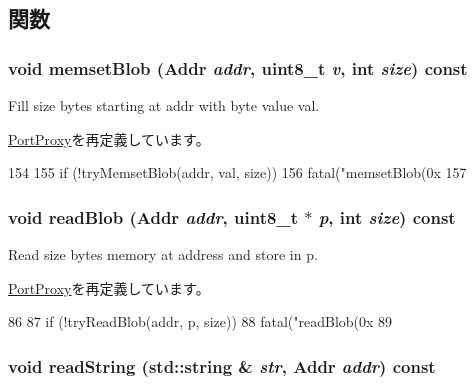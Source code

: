 \subsection{関数}
\hypertarget{classSETranslatingPortProxy_ab8c719f72992ac0e0b2b9a2c464a1456}{
\subsubsection[{memsetBlob}]{\setlength{\rightskip}{0pt plus 5cm}void memsetBlob ({\bf Addr} {\em addr}, \/  uint8\_\-t {\em v}, \/  int {\em size}) const}}
\label{classSETranslatingPortProxy_ab8c719f72992ac0e0b2b9a2c464a1456}
Fill size bytes starting at addr with byte value val. 

\hyperlink{classPortProxy_ad68c64ee0acd471129b53bbfd59a2f9a}{PortProxy}を再定義しています。


\begin{DoxyCode}
154 {
155     if (!tryMemsetBlob(addr, val, size))
156         fatal("memsetBlob(0x%
157 }
\end{DoxyCode}
\hypertarget{classSETranslatingPortProxy_a5580fe869fe8ffcffe2660eaa2c6276a}{
\subsubsection[{readBlob}]{\setlength{\rightskip}{0pt plus 5cm}void readBlob ({\bf Addr} {\em addr}, \/  uint8\_\-t $\ast$ {\em p}, \/  int {\em size}) const}}
\label{classSETranslatingPortProxy_a5580fe869fe8ffcffe2660eaa2c6276a}
Read size bytes memory at address and store in p. 

\hyperlink{classPortProxy_ad63586ad1fa7fd707ea7e03665c25502}{PortProxy}を再定義しています。


\begin{DoxyCode}
86 {
87     if (!tryReadBlob(addr, p, size))
88         fatal("readBlob(0x%
89 }
\end{DoxyCode}
\hypertarget{classSETranslatingPortProxy_a31157b758c97adefcb8b93b6d5587dda}{
\subsubsection[{readString}]{\setlength{\rightskip}{0pt plus 5cm}void readString (std::string \& {\em str}, \/  {\bf Addr} {\em addr}) const}}
\label{classSETranslatingPortProxy_a31157b758c97adefcb8b93b6d5587dda}



